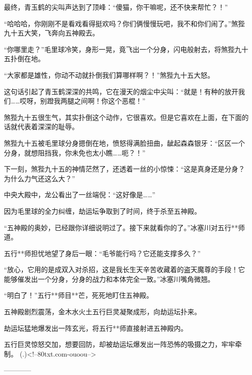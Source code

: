 \begin{this_body}
最终，青玉鹤的尖叫声达到了顶峰：“傻猫，你干嘛呢，还不快来帮忙？！”

“哈哈哈，你刚刚不是看戏看得挺欢吗？你们俩慢慢玩吧，我不和你们闹了。”煞狴九十五大笑，飞奔向五神殿去。

“你哪里走？”毛里球冷笑，身形一晃，竟飞出一个分身，闪电般射去，将煞狴九十五扑倒在地。

“大家都是雄性，你动不动就扑倒我们算哪样啊？！”煞狴九十五大怒。

这句话引起了青玉鹤深深的共鸣，它在漫天的烟尘中尖叫：“就是！有种的放开我们……哎呀，别蹬我两腿之间啊！你这个恶棍！”

煞狴九十五很生气，其实扑倒这个动作，它很喜欢。但是它喜欢在上面，在下面的话就代表着深深的耻辱。

煞狴九十五被毛里球分身摁倒在地，愤怒得满脸扭曲，龇起森森银牙：“区区一个分身，就想阻挡我，你未免也太小瞧……呃？！”

下一刻，煞狴九十五的神情茫然了，还透着一丝的小惊悚：“这是真身还是分身？为什么力气还这么大？”

中央大殿中，龙公看出了一丝端倪：“这好像是……”

因为毛里球的全力纠缠，劫运坛争取到了时间，终于杀至五神殿。

“五神殿的奥妙，已经跟你详细说明过了。接下来就看你的了。”冰塞川对五行**师道。

五行**师担忧地望了身后一眼：“毛爷能行吗？它还能支撑多久？”

“放心，它用的是成双入对杀招，这是我长生天辛苦收藏着的盗天魔尊的手段！它能够催发出一个分身，分身的战力和本体完全一致。”冰塞川嘴角微翘。

“明白了！”五行**师目**芒，死死地盯住五神殿。

五神殿剧烈震荡，金木水火土五行巨灵凝聚成形，向劫运坛扑来。

劫运坛猛地爆发出一阵玄光，将五行**师直接射进五神殿内。

五行巨灵惊怒交加，想要回防，却被劫运坛爆发出一阵恐怖的吸摄之力，牢牢牵制。	 (.)<!--80txt.com-ouoou-->

------------

\end{this_body}

